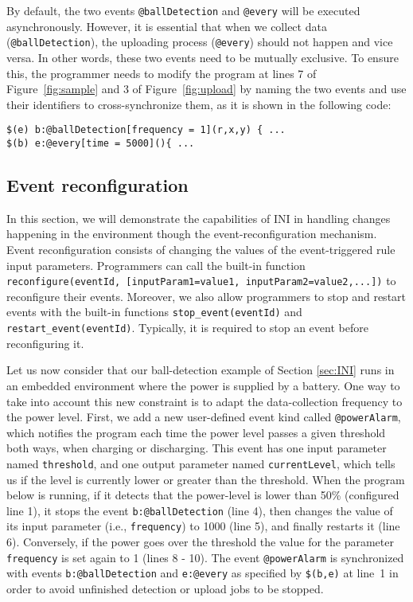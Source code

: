 \documentclass[runningheads,a4paper]{llncs}
\begin{document}
By default, the two events \texttt{@ballDetection} and \texttt{@every} will be executed asynchronously. However, it is essential that when we collect data (\texttt{@ballDetec\-tion}), the uploading process (\texttt{@every}) should not happen and vice versa. In other words, these two events need to be mutually exclusive. To ensure this, the programmer needs to modify the program at lines 7 of Figure~\ref{fig:sample} and 3 of Figure~\ref{fig:upload} by naming the two events and use their identifiers to cross-synchronize them, as it is shown in the following code:

\begin{lstlisting}[numbers=none]
$(e) b:@ballDetection[frequency = 1](r,x,y) { ...
$(b) e:@every[time = 5000](){ ...
\end{lstlisting}

\subsection{Event reconfiguration}

In this section, we will demonstrate the capabilities of INI in handling changes happening in the environment though the event-reconfiguration mechanism. Event reconfiguration consists of changing the values of the event-triggered rule input parameters. Programmers can call the built-in function \texttt{reconfigure(eventId, [inputParam1=value1, inputParam2=value2,...])} to reconfigure their events. Moreover, we also allow programmers to stop and restart events with the built-in functions \texttt{stop\_event(eventId)} and \texttt{restart\_event(eventId)}. Typically, it is required to stop an event before reconfiguring it.

Let us now consider that our ball-detection example of Section \ref{sec:INI} runs in an embedded environment where the power is supplied by a battery. One way to take into account this new constraint is to adapt the data-collection frequency to the power level. First, we add a new user-defined event kind called \texttt{@powerAlarm}, which notifies the program each time the power level passes a given threshold both ways, when charging or discharging. This event has one input parameter named \texttt{threshold}, and one output parameter named \texttt{currentLevel}, which tells us if the level is currently lower or greater than the threshold. When the program below is running, if it detects that the power-level is lower than 50\% (configured line 1), it stops the event \texttt{b:@ballDetection} (line 4), then changes the value of its input parameter (i.e., \texttt{frequency}) to 1000 (line 5), and finally restarts it  (line 6). Conversely, if the power goes over the threshold the value for the parameter \texttt{frequency} is set again to 1 (lines 8 - 10). The event \texttt{@powerAlarm} is synchronized with events \texttt{b:@ballDetection} and \texttt{e:@every} as specified by \texttt{\$(b,e)} at line~1 in order to avoid unfinished detection or upload jobs to be stopped.
\end{document}
